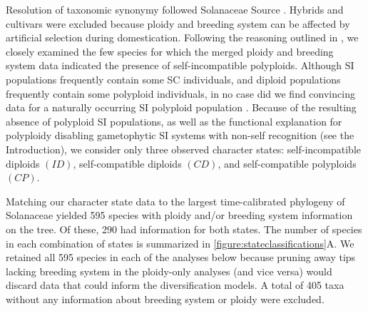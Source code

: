 Resolution of taxonomic synonymy followed Solanaceae Source \citep{solsource}. 
Hybrids and cultivars were excluded because ploidy and breeding system can be affected by artificial selection during domestication.
Following the reasoning outlined in \citet{robertson_2011}, we closely examined the few species for which the merged ploidy and breeding system data indicated the presence of self-incompatible polyploids.
Although SI populations frequently contain some SC individuals, and diploid populations frequently contain some polyploid individuals, in no case did we find convincing data for a naturally occurring SI polyploid population  \citep[discussed in][]{robertson_2011}.
Because of the resulting absence of polyploid SI populations, as well as the functional explanation for polyploidy disabling gametophytic SI systems with non-self recognition (see the Introduction), we consider only three observed character states: self-incompatible diploids $(ID)$, self-compatible diploids $(CD)$, and self-compatible polyploids $(CP)$.

Matching our character state data to the largest time-calibrated phylogeny of Solanaceae \citep{sarkinen_2013} yielded 595 species with ploidy and/or breeding system information on the tree.
Of these, 290 had information for both states.
The number of species in each combination of states is summarized in \cref{figure:stateclassifications}A.
We retained all 595 species in each of the analyses below because pruning away tips lacking breeding system in the ploidy-only analyses (and vice versa) would discard data that could inform the diversification models.
A total of 405 taxa without any information about breeding system or ploidy were excluded.

